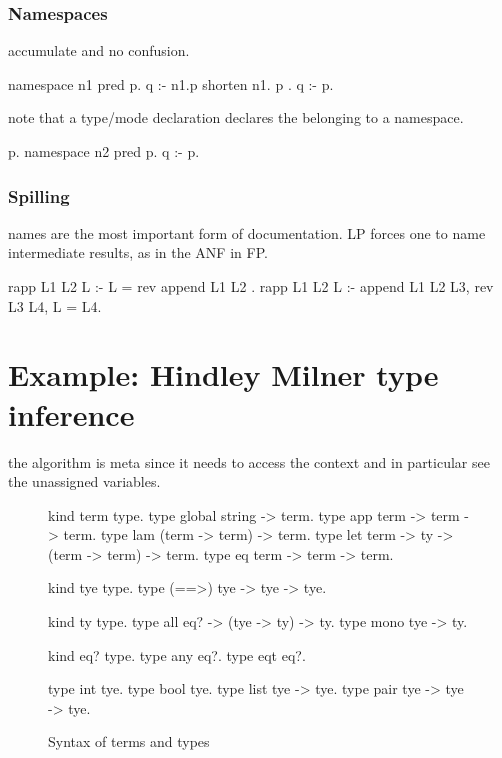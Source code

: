 \documentclass[a4paper, 11pt]{book}
\begin{document}
\subsubsection{Namespaces}

accumulate and no confusion.

\begin{elpicode}
namespace n1 {
  pred p.
}
q :- n1.p
shorten n1.{ p }.
q :- p.
\end{elpicode}

note that a type/mode declaration declares the belonging to a namespace.

\begin{elpicode}
p.
namespace n2 {
  pred p.
  q :- p.
}
\end{elpicode}

\subsubsection{Spilling}

names are the most important form of documentation.
LP forces one to name intermediate results, as in the ANF
in FP.

\begin{elpicode}
rapp L1 L2 L :- L = {rev {append L1 L2} }.
rapp L1 L2 L :- append L1 L2 L3, rev L3 L4, L = L4.
\end{elpicode}

\section{Example: Hindley Milner type inference}

the algorithm is meta since it needs to access the context and
in particular see the unassigned variables.

\begin{figure}
\begin{elpicode}
kind term type.
type global  string -> term.
type app term -> term -> term.
type lam (term -> term) -> term.
type let term -> ty -> (term -> term) -> term.
type eq  term -> term -> term.

kind tye type.
type (==>) tye -> tye -> tye.  

kind ty type.
type all    eq? -> (tye -> ty) -> ty.
type mono   tye -> ty.

kind eq? type.
type any eq?. %
type eqt eq?. %

type int   tye.
type bool  tye.
type list  tye -> tye.
type pair  tye -> tye -> tye.
\end{elpicode}
\caption[syntax]{Syntax of terms and types\label{hm:syntax}}
\end{figure}
\end{document}

